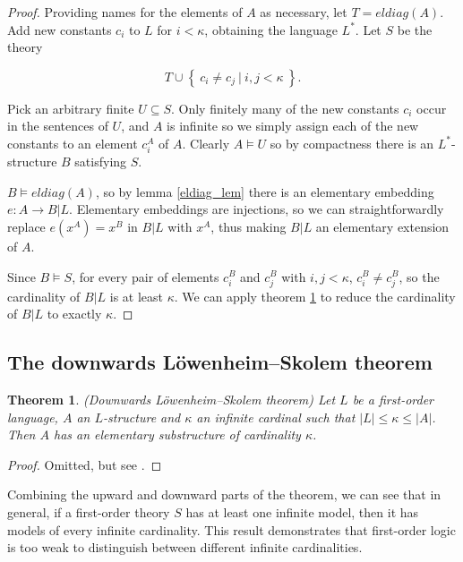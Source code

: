 \documentclass[10pt, a4paper, oneside]{article}
\newtheorem{thm}{Theorem}[section]
\theoremstyle{definition}
\theoremstyle{remark}
\theoremstyle{plain}
\theoremstyle{plain}
\begin{document}
\begin{proof}
    Providing names for the elements of $A$ as necessary, let $T = eldiag(A)$.
    Add new constants $c_i$ to $L$ for $i < \kappa$, obtaining the language
    $L^*$. Let $S$ be the theory
    
    \begin{displaymath}
        T \cup \left\{\ c_i \neq c_j\ |\ i, j < \kappa\ \right\}.
    \end{displaymath}
    
    Pick an arbitrary finite $U \subseteq S$. Only finitely many of the new
    constants $c_i$ occur in the sentences of $U$, and $A$ is infinite so we
    simply assign each of the new constants to an element $c^A_i$ of $A$.
    Clearly $A \models U$ so by compactness there is an $L^*$-structure $B$
    satisfying $S$.
    
    $B \models eldiag(A)$, so by lemma \ref{eldiag_lem} there is an elementary
    embedding $e : A \rightarrow B | L$. Elementary embeddings are injections,
    so we can straightforwardly replace $e(x^A) = x^B$ in $B | L$ with $x^A$,
    thus making $B | L$ an elementary extension of $A$.
    
    Since $B \models S$, for every pair of elements $c^B_i$ and $c^B_j$ with
    $i, j < \kappa$, $c^B_i \neq c^B_j$, so the cardinality of $B | L$ is at
    least $\kappa$. We can apply theorem \ref{down_lst} to reduce the
    cardinality of $B | L$ to exactly $\kappa$.
\end{proof}

\subsection{The downwards Löwenheim--Skolem theorem}

\begin{thm}
    \label{down_lst}
    (Downwards Löwenheim--Skolem theorem) Let $L$ be a first-order language,
    $A$ an $L$-structure and $\kappa$ an infinite cardinal such that $|L| \leq
    \kappa \leq |A|$. Then $A$ has an elementary substructure of cardinality
    $\kappa$.
\end{thm}

\begin{proof}
    Omitted, but see \citealt[pp. 69--72]{hodges1997}.
\end{proof}

Combining the upward and downward parts of the theorem, we can see that in
general, if a first-order theory $S$ has at least one infinite model, then it
has models of every infinite cardinality. This result demonstrates that
first-order logic is too weak to distinguish between different infinite
cardinalities.
\end{document}
